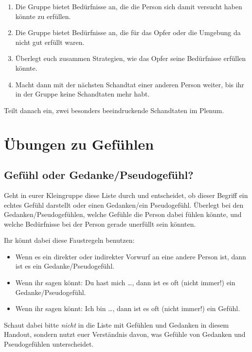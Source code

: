 \begin{enumerate}
  \item Die Gruppe bietet Bedürfnisse an, die die Person sich damit versucht haben könnte zu erfüllen.
  \item Die Gruppe bietet Bedürfnisse an, die für das \glqq Opfer\grqq{} oder die Umgebung da nicht gut erfüllt waren.
  \item Überlegt euch zusammen Strategien, wie das \glqq Opfer\grqq{} seine Bedürfnisse erfüllen könnte.
  \item Macht dann mit der nächsten Schandtat einer anderen Person weiter, bis ihr in der Gruppe keine Schandtaten mehr habt.
\end{enumerate}

Teilt danach ein, zwei besonders beeindruckende Schandtaten im Plenum.


\section{Übungen zu Gefühlen}


\subsection{Gefühl oder Gedanke/Pseudogefühl?}

Geht in eurer Kleingruppe diese Liste durch und entscheidet, ob dieser Begriff ein echtes Gefühl darstellt oder einen Gedanken/ein Pseudogefühl. Überlegt bei den Gedanken/Pseudogefühlen, welche Gefühle die Person dabei fühlen könnte, und welche Bedürfnisse bei der Person gerade unerfüllt sein könnten.

Ihr könnt dabei diese Faustregeln benutzen:

\begin{itemize}
  \item Wenn es ein direkter oder indirekter Vorwurf an eine andere Person ist, dann ist es ein Gedanke/Pseudogefühl.
  \item Wenn ihr sagen könnt: \glqq Du hast mich \ldots\grqq, dann ist es oft (nicht immer!) ein Gedanke/Pseudogefühl.
  \item Wenn ihr sagen könnt: \glqq Ich bin \ldots\grqq, dann ist es oft (nicht immer!) ein Gefühl.
\end{itemize}

Schaut dabei bitte \emph{nicht} in die Liste mit Gefühlen und Gedanken in diesem Handout, sondern nutzt euer Verständnis davon, was Gefühle von Gedanken und Pseudogefühlen unterscheidet.

